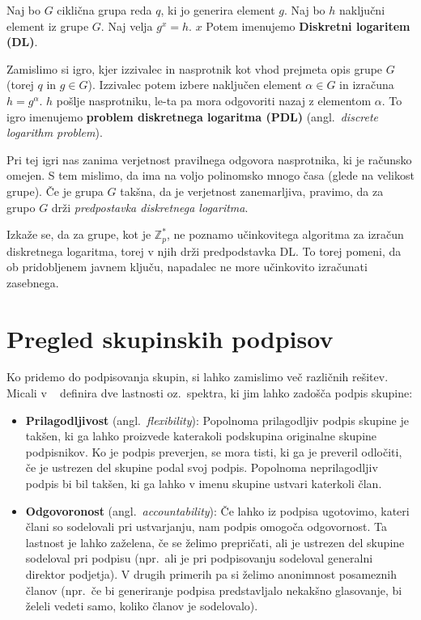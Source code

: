 \documentclass[isrm2, tisk]{fmfdelo}
\newcommand{\Z}{\mathbb Z}
\begin{document}
\begin{definicija}
    Naj bo $G$ ciklična grupa reda $q$, ki jo generira element $g$. Naj bo $h$ naključni element iz 
    grupe $G$. Naj velja $g^x = h$. $x$ Potem imenujemo \textbf{Diskretni logaritem (DL)}.

    Zamislimo si igro, kjer izzivalec in nasprotnik kot vhod prejmeta opis grupe $G$ (torej $q$ in 
    $g \in G$). Izzivalec potem izbere naključen element $\alpha \in G$ in izračuna $h = g^{\alpha}$.
    $h$ pošlje nasprotniku, le-ta pa mora odgovoriti nazaj z elementom $\alpha$. To igro imenujemo 
    \textbf{problem diskretnega logaritma (PDL)} (angl.\ \textit{discrete logarithm problem}).

    Pri tej igri nas zanima verjetnost pravilnega odgovora nasprotnika, ki je računsko omejen. S tem 
    mislimo, da ima na voljo polinomsko mnogo časa (glede na velikost grupe). Če je grupa $G$ takšna, 
    da je verjetnost zanemarljiva, pravimo, da za grupo $G$ drži \textit{predpostavka diskretnega 
    logaritma}.
\end{definicija}

Izkaže se, da za grupe, kot je $\Z_p^*$, ne poznamo učinkovitega algoritma za izračun diskretnega 
logaritma, torej v njih drži predpodstavka DL. To torej pomeni, da ob pridobljenem javnem ključu, 
napadalec ne more učinkovito izračunati zasebnega.

\section{Pregled skupinskih podpisov}
Ko pridemo do podpisovanja skupin, si lahko zamislimo več različnih rešitev. Micali v ~\cite{micali2001asm} 
definira dve lastnosti oz.\ spektra, ki jim lahko zadošča podpis skupine:
\begin{itemize}
    \item \textbf{Prilagodljivost} (angl.\ \textit{flexibility}): Popolnoma prilagodljiv podpis skupine
        je takšen, ki ga lahko proizvede katerakoli podskupina originalne skupine podpisnikov. Ko je podpis 
        preverjen, se mora tisti, ki ga je preveril odločiti, če je ustrezen del skupine podal svoj podpis. 
        Popolnoma neprilagodljiv podpis bi bil takšen, ki ga lahko v imenu skupine ustvari katerkoli član.
    \item \textbf{Odgovoronost} (angl.\ \textit{accountability}): Če lahko iz podpisa ugotovimo, kateri člani 
        so sodelovali pri ustvarjanju, nam podpis omogoča odgovornost. Ta lastnost je lahko zaželena, če 
        se želimo prepričati, ali je ustrezen del skupine sodeloval pri podpisu (npr.\ ali je pri podpisovanju 
        sodeloval generalni direktor podjetja). V drugih primerih pa si želimo anonimnost posameznih članov 
        (npr.\ če bi generiranje podpisa predstavljalo nekakšno glasovanje, bi želeli vedeti samo, koliko 
        članov je sodelovalo).
\end{itemize}
\end{document}
